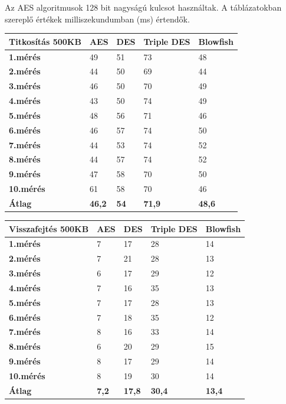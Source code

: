 \newpage
\noindent Az AES algoritmusok 128 bit nagyságú kulcsot használtak. A táblázatokban szereplő értékek milliszekundumban (ms) értendők.
\begin{center}
	\begin{tabular}{|p{2.4cm}|p{2cm}|p{2cm}|p{2cm}|p{2cm}|}
		\hline
		\textbf{Titkosítás} \newline \textbf{500KB} & \textbf{AES} & \textbf{DES} & \textbf{Triple DES} & \textbf{Blowfish}\\
		\hline
		\textbf{1.mérés} & 49 & 51 & 73 & 48\\
		\hline
		\textbf{2.mérés} & 44 & 50 & 69 & 44\\
		\hline
		\textbf{3.mérés} & 46 & 50 & 70 & 49\\
		\hline
		\textbf{4.mérés} & 43 & 50 & 74 & 49\\
		\hline
		\textbf{5.mérés} & 48 & 56 & 71 & 46\\
		\hline
		\textbf{6.mérés} & 46 & 57 & 74 & 50\\
		\hline
		\textbf{7.mérés} & 44 & 53 & 74 & 52\\
		\hline
		\textbf{8.mérés} & 44 & 57 & 74 & 52\\
		\hline
		\textbf{9.mérés} & 47 & 58 & 70 & 50\\
		\hline
		\textbf{10.mérés} & 61 & 58 & 70 & 46\\
		\hline
		\hline
		\textbf{Átlag} & \textbf{46,2} & \textbf{54} & \textbf{71,9} & \textbf{48,6}\\
		\hline
	\end{tabular}
\end{center}

\begin{center}
	\begin{tabular}{|p{2.4cm}|p{2cm}|p{2cm}|p{2cm}|p{2cm}|}
		\hline
		\textbf{Visszafejtés} \newline \textbf{500KB} & \textbf{AES} & \textbf{DES} & \textbf{Triple DES} & \textbf{Blowfish}\\
		\hline
		\textbf{1.mérés} & 7 & 17 & 28 & 14\\
		\hline
		\textbf{2.mérés} & 7 & 21 & 28 & 13\\
		\hline
		\textbf{3.mérés} & 6 & 17 & 29 & 12\\
		\hline
		\textbf{4.mérés} & 7 & 16 & 35 & 13\\
		\hline
		\textbf{5.mérés} & 7 & 17 & 28 & 13\\
		\hline
		\textbf{6.mérés} & 7 & 18 & 35 & 12\\
		\hline
		\textbf{7.mérés} & 8 & 16 & 33 & 14\\
		\hline
		\textbf{8.mérés} & 6 & 20 & 29 & 15\\
		\hline
		\textbf{9.mérés} & 8 & 17 & 29 & 14\\
		\hline
		\textbf{10.mérés} & 8 & 19 & 30 & 14\\
		\hline
		\hline
		\textbf{Átlag} & \textbf{7,2} & \textbf{17,8} & \textbf{30,4} & \textbf{13,4}\\
		\hline
	\end{tabular}
\end{center}

